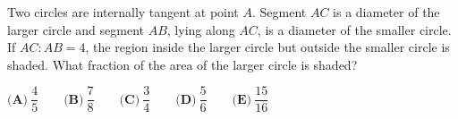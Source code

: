 Two circles are internally tangent at point $A$. Segment $AC$ is a diameter of the larger circle and segment $AB$, lying along $AC$, is a diameter of the smaller circle. If $AC:AB=4$, the region inside the larger circle but outside the smaller circle is shaded. What fraction of the area of the larger circle is shaded?

$\textbf{(A)}\ \dfrac{4}{5}\qquad\textbf{(B)}\ \dfrac{7}{8}\qquad\textbf{(C)}\ \dfrac{3}{4}\qquad\textbf{(D)}\ \dfrac{5}{6}\qquad\textbf{(E)}\ \dfrac{15}{16}$
